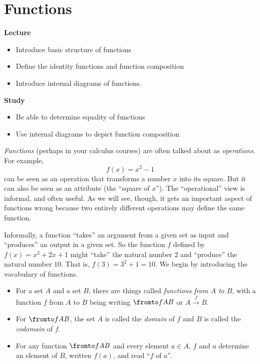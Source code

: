 \chapter{Functions}

\begin{goals}
\noindent\textbf{Lecture}
\begin{itemize}
\item Introduce basic structure of functions
\item Define the identity functions and function composition
\item Introduce internal diagrams of functions.
\end{itemize}

\noindent\textbf{Study}
\begin{itemize}
\item Be able to determine equality of functions
\item Use internal diagrams to depict function composition
\end{itemize}
\end{goals}

\emph{Functions}
(perhaps in your calculus courses) are often talked about as \emph{operations}. 
For example, \[f(x) = x^2-1\]
can be seen as an operation that transforms a number $x$ into its
square. But it can also be seen as an attribute (the ``square of
$x$''). The ``operational'' view is informal, and often useful. As we will see,
though, it gets an important aspect of functions wrong because
two entirely different operations may define the same function.

Informally, a function ``takes'' an argument from a given set as input and ``produces'' an output in a given set.
So the function $f$ defined by $f(x)=x^2 + 2x + 1$ might ``take'' the natural number $2$
and ``produce'' the natural number $10$. That is, $f(3)=3^2 + 1 = 10$. 
We begin by introducing the vocabulary of functions.

\begin{signature}
	\begin{itemize}
	\item For a set $A$ and a set $B$, there are things called 
	\emph{functions from $A$ to $B$}, with a function $f$ from $A$ to $B$ 
	being writing $\fromto fAB$ or $A\stackrel{f}{\to} B$. 
	
	\item For $\fromto fAB$, the set $A$ is called the \emph{domain} of $f$
	and $B$ is called the \emph{codomain} of $f$.
	
	\item For any function $\fromto fAB$ and every element $a\in A$, $f$ and $a$ determine an element of $B$,
	written $f(a)$, and read ``$f$ of $a$''.
	\end{itemize}
\end{signature}

